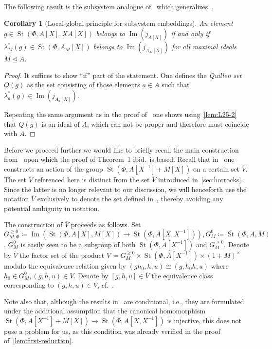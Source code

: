 \documentclass[oneside, 10pt]{amsart}
\DeclareMathOperator{\St}{St}
\DeclareMathOperator{\Img}{Im}
\newcommand{\inv}{^{-1}}
\numberwithin{equation}{section}
\numberwithin{thm}{section}
\numberwithin{lemma}{section}
\newtheorem{cor}[thm]{Corollary}
\theoremstyle{definition}
\theoremstyle{remark}
\begin{document}
The following result is the subsystem analogue of~\cite[Theorem~2]{LS17} which generalizes~\cite[Theorem~2.1]{Tu83}.
\begin{cor}[Local-global principle for subsystem embeddings] \label{cor:QS-subsystem}
An element $g \in \St(\Phi, A[X], XA[X])$ belongs to $\Img(j_{A[X]})$ if and only if
$\lambda_M^*(g) \in \St(\Phi, A_M[X])$ belongs to $\Img(j_{A_M[X]})$ for all maximal ideals $M \trianglelefteq A$.
\end{cor}
\begin{proof}
It suffices to show ``if'' part of the statement.
One defines the \textit{Quillen set} $Q(g)$ as the set consisting of those elements $a \in A$
such that $\lambda_a^*(g) \in \Img(j_{A_a[X]})$.

Repeating the same argument as in the proof of~\cite[Theorem~2]{S15} one shows using~\cref{lem:L25-2}
that $Q(g)$ is an ideal of $A$, which can not be proper and therefore must coincide with $A$.
\end{proof}

Before we proceed further we would like to briefly recall the main construction from~\cite{LS20} upon which
the proof of Theorem~1 ibid.\ is based.
Recall that in~\cite{LS20} one constructs an action of the group $\St(\Phi, A[X\inv] + M[X])$ on a certain set $\overline{V}$.
The set $\overline{V}$ referenced here is distinct from the set $\overline{V}$ introduced in~\cref{sec:horrocks}.
Since the latter is no longer relevant to our discussion, we will henceforth use the notation $\overline{V}$ exclusively to denote the set defined in~\cite{LS20},
thereby avoiding any potential ambiguity in notation.

The construction of $\overline{V}$ proceeds as follows.
Set $G_{M, \Phi}^{\geq 0} \coloneqq \Img(\St(\Phi, A[X], M[X]) \to \St(\Phi, A[X, X\inv])), G_M^0 \coloneqq \overline{\St}(\Phi, A, M)$.
$G_M^0$ is easily seen to be a subgroup of both $\St(\Phi, A[X\inv])$ and $G_M^{\geq 0}$.
Denote by $\overline{V}$ the factor set of the product $V \coloneqq G_M^{\geq 0} \times \St(\Phi, A[X\inv]) \times (1 + M)^\times$
modulo the equivalence relation given by $(gh_0, h, u) \cong (g, h_0h, u)$ where $h_0 \in G_M^0, (g, h, u) \in V.$
Denote by $[g, h, u] \in \overline{V}$ the equivalence class corresponding to $(g, h, u)\in V$, cf.~\cite[\S~5.4]{LS20}.

Note also that, although the results in~\cite[\S~5.5]{LS20} are conditional,
i.e., they are formulated under the additional assumption that the canonical homomorphism $\St(\Phi, A[X^{-1}] + M[X]) \to \St(\Phi, A[X, X^{-1}])$ is injective,
this does not pose a problem for us, as this condition was already verified in the proof of~\cref{lem:first-reduction}.
\end{document}
